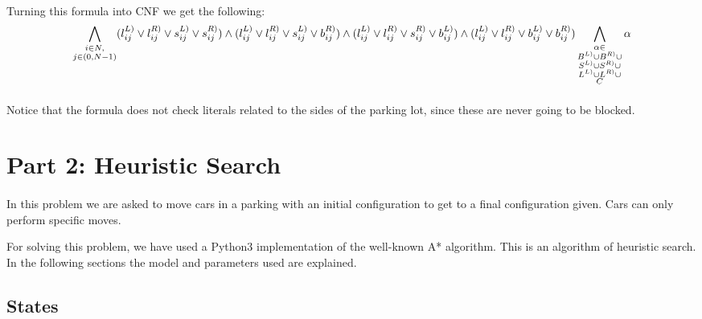 \paragraph{}
Turning this formula into CNF we get the following:
\begin{equation}
  \bigwedge_{\substack{i \in N,\\ j \in (0, N-1)}}
  (l^{L)}_{ij} \lor l^{R)}_{ij} \lor s^{L)}_{ij} \lor s^{R)}_{ij}) \land
  (l^{L)}_{ij} \lor l^{R)}_{ij} \lor s^{L)}_{ij} \lor b^{R)}_{ij}) \land
  (l^{L)}_{ij} \lor l^{R)}_{ij} \lor s^{R)}_{ij} \lor b^{L)}_{ij}) \land
  (l^{L)}_{ij} \lor l^{R)}_{ij} \lor b^{L)}_{ij} \lor b^{R)}_{ij})
  \bigwedge_{\substack{
      \alpha \in\\
      B^{L)} \cup
      B^{R)} \cup \\
      S^{L)} \cup
      S^{R)} \cup \\
      L^{L)} \cup
      L^{R)} \cup \\
      C
    }}
    \alpha
\end{equation}

\paragraph{}
Notice that the formula does not check literals related to the sides of the parking lot, since these are never going to be blocked.


\section{Part 2: Heuristic Search}

\paragraph{}
In this problem we are asked to move cars in a parking with an initial
configuration to get to a final configuration given. Cars can only perform
specific moves.

For solving this problem, we have used a Python3 implementation of the well-known
A* algorithm. This is an algorithm of heuristic search. In the following
sections the model and parameters used are explained.

\subsection{States}


